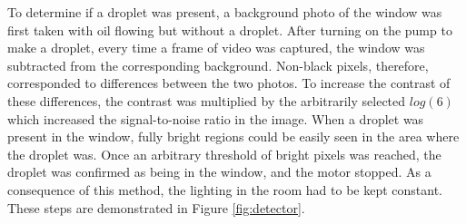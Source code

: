 \documentclass{physics_article_B}
\begin{document}
            To determine if a droplet was present, a background photo of the window was first taken with oil flowing but without a droplet. After turning on the pump to make a droplet, every time a frame of video was captured, the window was subtracted from the corresponding background. Non-black pixels, therefore, corresponded to differences between the two photos. To increase the contrast of these differences, the contrast was multiplied by the arbitrarily selected $log(6)$ which increased the signal-to-noise ratio in the image. When a droplet was present in the window, fully bright regions could be easily seen in the area where the droplet was. Once an arbitrary threshold of bright pixels was reached, the droplet was confirmed as being in the window, and the motor stopped. As a consequence of this method, the lighting in the room had to be kept constant. These steps are demonstrated in Figure \ref{fig:detector}.
            
\end{document}
